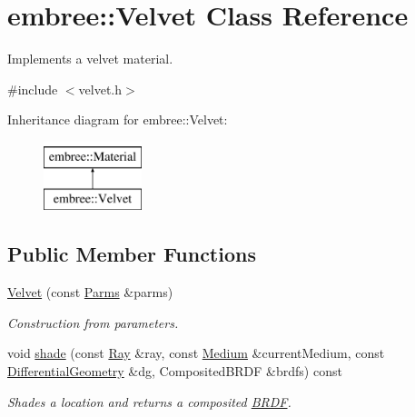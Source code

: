 \hypertarget{classembree_1_1_velvet}{
\section{embree::Velvet Class Reference}
\label{classembree_1_1_velvet}
}


Implements a velvet material.  




{\ttfamily \#include $<$velvet.h$>$}

Inheritance diagram for embree::Velvet:\begin{figure}[H]
\begin{center}
\leavevmode
\includegraphics[height=2.000000cm]{classembree_1_1_velvet}
\end{center}
\end{figure}
\subsection*{Public Member Functions}
\begin{DoxyCompactItemize}
\item 
\hyperlink{classembree_1_1_velvet_aa5bb65d1a01f3465f550d34d203a1638}{Velvet} (const \hyperlink{classembree_1_1_parms}{Parms} \&parms)
\begin{DoxyCompactList}\small\item\em Construction from parameters. \item\end{DoxyCompactList}\item 
\hypertarget{classembree_1_1_velvet_aff0abd42409671e154e3864b5e5e970c}{
void \hyperlink{classembree_1_1_velvet_aff0abd42409671e154e3864b5e5e970c}{shade} (const \hyperlink{structembree_1_1_ray}{Ray} \&ray, const \hyperlink{classembree_1_1_medium}{Medium} \&currentMedium, const \hyperlink{structembree_1_1_differential_geometry}{DifferentialGeometry} \&dg, CompositedBRDF \&brdfs) const }
\label{classembree_1_1_velvet_aff0abd42409671e154e3864b5e5e970c}

\begin{DoxyCompactList}\small\item\em Shades a location and returns a composited \hyperlink{classembree_1_1_b_r_d_f}{BRDF}. \item\end{DoxyCompactList}\end{DoxyCompactItemize}


